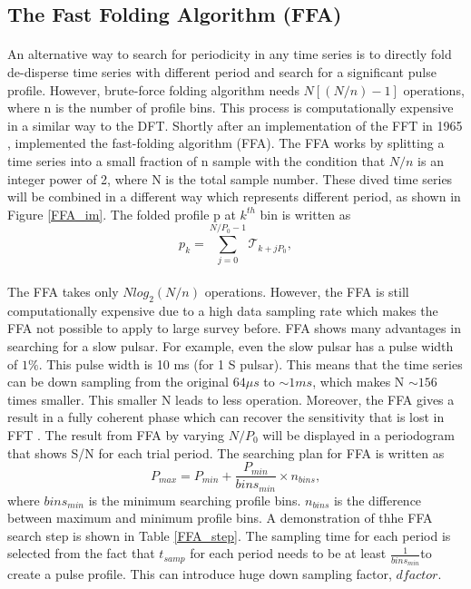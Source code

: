\documentclass[thesis_msc.tex]{subfiles}
\begin{document}
        \subsection{The Fast Folding Algorithm (FFA)} \label{FFA}
        \paragraph{} An alternative way to search for periodicity in any time series is to directly fold de-disperse time series with different period and search for a significant pulse profile. However, brute-force folding algorithm needs $N[(N/n)-1]$ operations, where n is the number of profile bins. This process is computationally expensive in a similar way to the DFT. Shortly after an implementation of the FFT in 1965 \citep{FFT}, \cite{staelin1969passive} implemented the fast-folding algorithm (FFA). The FFA works by splitting a time series into a small fraction of n sample with the condition that $N/n$ is an integer power of 2, where N is the total sample number. These dived time series will be combined in a different way which represents different period, as shown in Figure \ref{FFA_im}. The folded profile p at $k^{th}$ bin is written as 
        \begin{equation}
        p_k=\sum_{j=0}^{N/P_0-1}\mathcal{T}_{k+jP_0},
        \end{equation}
        \paragraph{}The  FFA takes only $Nlog_2(N/n)$ operations. However, the FFA is still computationally expensive due to a high data sampling rate which makes the FFA not possible to apply to large survey before. FFA shows many advantages in searching for a slow pulsar. For example, even the slow pulsar has a pulse width of $1\%$. This pulse width is 10 ms (for 1 S pulsar). This means that the time series can be down sampling from the original $64 \mu s$ to $\sim 1ms$, which makes N $\sim 156$ times smaller. This smaller N leads to less operation. Moreover, the FFA gives a result in a fully coherent phase which can recover the sensitivity that is lost in FFT \citep{kondratiev2009new}. The result from FFA by varying $N/P_0$ will be displayed in a periodogram that shows S/N for each trial period. The searching plan for FFA is written as 
        \begin{equation}
        P_{max}=P_{min}+\frac{P_{min}}{bins_{min}} \times n_{bins},
        \end{equation}
where $bins_{min}$ is the minimum searching profile bins. $n_{bins} $ is the difference between maximum and minimum profile bins. A demonstration of thhe FFA search step is shown in Table \ref{FFA_step}. The sampling time for each period is selected from the fact that $t_{samp}$ for each period needs to be at least $\frac{1}{bins_{min}}$to create a pulse profile. This can introduce huge down sampling factor, $dfactor$. 
        
\end{document}
